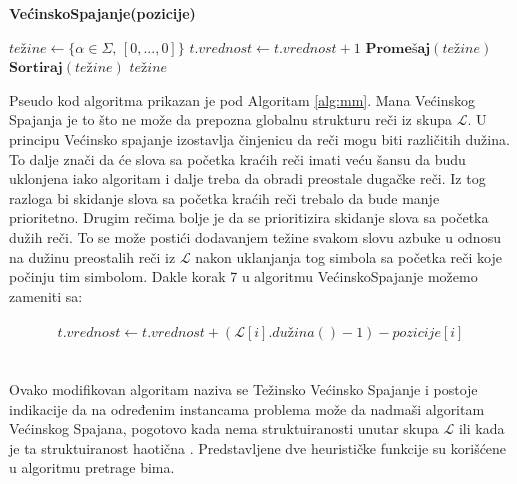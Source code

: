 \documentclass[12pt,oneside]{memoir}
\begin{document}
\begin{algorithm}
  \caption{\textbf{VećinskoSpajanje(pozicije)}}
  \label{alg:mm}
  \begin{algorithmic}[1]
  \State $te\textrm{ž}ine \gets \{\alpha \in \Sigma\textrm{, }[0,...,0] \}$ 
  \State
          \State $t.vrednost \gets t.vrednost + 1$
        \EndIf 
      \EndFor
    \EndIf 
  \EndFor
  \State
  \State $\textbf{Promešaj}(te\textrm{ž}ine)$
  \State $\textbf{Sortiraj}(te\textrm{ž}ine)$
  \State
  \State \Return $te\textrm{ž}ine$
  \end{algorithmic}
  \end{algorithm}

Pseudo kod algoritma prikazan je pod Algoritam \ref{alg:mm}.
Mana Većinskog Spajanja je to što ne može da prepozna globalnu strukturu reči iz skupa $\mathcal{L}$.
U principu Većinsko spajanje izostavlja činjenicu da reči mogu biti različitih dužina. To dalje 
znači da će slova sa početka kraćih reči imati veću šansu da budu uklonjena iako algoritam i dalje treba
da obradi preostale dugačke reči. Iz tog razloga bi skidanje slova sa početka kraćih reči trebalo da bude
manje prioritetno. Drugim rečima bolje je da se prioritizira skidanje slova sa početka dužih reči.
To se može postići dodavanjem težine svakom slovu azbuke u odnosu na dužinu preostalih reči iz $\mathcal{L}$ 
nakon uklanjanja tog simbola sa početka reči koje počinju tim simbolom. Dakle korak 7 u algoritmu VećinskoSpajanje
možemo zameniti sa:
\\
\\
\begin{equation}
  \label{eqn:wmm}
  t.vrednost \gets t.vrednost + (\mathcal{L}[i].du\textrm{ž}ina() - 1) - pozicije[i]
\end{equation}
\\
\\
Ovako modifikovan algoritam naziva se Težinsko Većinsko Spajanje i postoje indikacije da na određenim instancama
problema može da nadmaši algoritam Većinskog Spajana, pogotovo kada nema struktuiranosti unutar skupa $\mathcal{L}$
ili kada je ta struktuiranost haotična \cite{ProbabilisticBS}. Predstavljene dve heurističke
funkcije su korišćene u algoritmu pretrage bima.

% 
\end{document}
